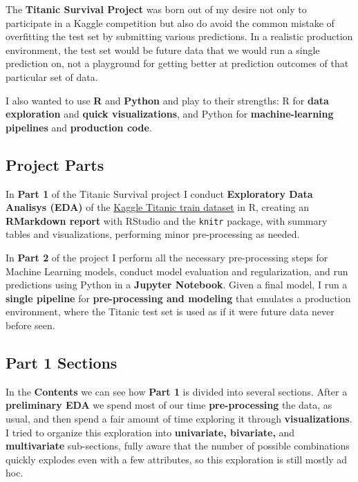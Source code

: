 \documentclass[]{article}
\begin{document}
The \textbf{Titanic Survival Project} was born out of my desire not only
to participate in a Kaggle competition but also do avoid the common
mistake of overfitting the test set by submitting various predictions.
In a realistic production environment, the test set would be future data
that we would run a single prediction on, not a playground for getting
better at prediction outcomes of that particular set of data.

I also wanted to use \textbf{R} and \textbf{Python} and play to their
strengths: R for \textbf{data exploration} and \textbf{quick
visualizations}, and Python for \textbf{machine-learning pipelines} and
\textbf{production code}.

\subsection{Project Parts}\label{project-parts}

In \textbf{Part 1} of the Titanic Survival project I conduct
\textbf{Exploratory Data Analisys (EDA)} of the
\href{https://www.kaggle.com/c/titanic/data}{Kaggle Titanic train
dataset} in R, creating an \textbf{RMarkdown report} with RStudio and
the \texttt{knitr} package, with summary tables and visualizations,
performing minor pre-processing as needed.

In \textbf{Part 2} of the project I perform all the necessary
pre-processing steps for Machine Learning models, conduct model
evaluation and regularization, and run predictions using Python in a
\textbf{Jupyter Notebook}. Given a final model, I run a \textbf{single
pipeline} for \textbf{pre-processing and modeling} that emulates a
production environment, where the Titanic test set is used as if it were
future data never before seen.

\subsection{Part 1 Sections}\label{part-1-sections}

In the \textbf{Contents} we can see how \textbf{Part 1} is divided into
several sections. After a \textbf{preliminary EDA} we spend most of our
time \textbf{pre-processing} the data, as usual, and then spend a fair
amount of time exploring it through \textbf{visualizations}. I tried to
organize this exploration into \textbf{univariate, bivariate,} and
\textbf{multivariate} sub-sections, fully aware that the number of
possible combinations quickly explodes even with a few attributes, so
this exploration is still mostly ad hoc.
\end{document}
